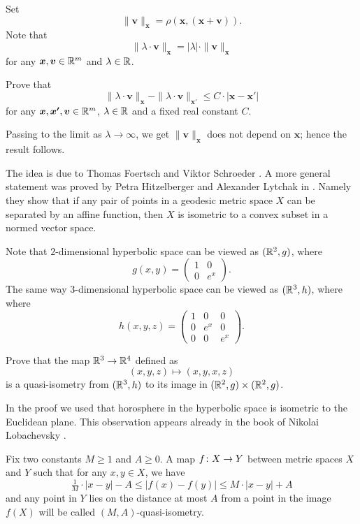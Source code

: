 Set 
\[\|\bm{v}\|_{\bm{x}}=\rho(\bm{x},(\bm{x}+\bm{v})).\]
Note that 
\[ \|\lambda\cdot\bm{v}\|_{\bm{x}}
=
|\lambda|\cdot\|\bm{v}\|_{\bm{x}}\]
for any $\bm{x},\bm{v}\in\mathbb{R}^m$ and $\lambda\in\mathbb{R}$.

Prove that 
\[
\|\lambda\cdot\bm{v}\|_{\bm{x}}
-
\|\lambda\cdot\bm{v}\|_{\bm{x}'}
\le 
C\cdot |\bm{x}-\bm{x'}|\]
for any $\bm{x},\bm{x'},\bm{v}\in\mathbb{R}^m$, 
$\lambda\in\mathbb{R}$
and a fixed real constant $C$.

Passing to the limit as $\lambda\to\infty$, 
we get
$\|\bm{v}\|_{\bm{x}}$ does not depend on $\bm{x}$;
hence the result follows.\qeds


The idea is due to Thomas Foertsch
and Viktor Schroeder \cite[see][]{foertsch-schroeder}.
A more general statement was proved by Petra Hitzelberger and Alexander Lytchak in \cite{hitzelberger-lytchak}.
Namely they show that 
if any pair of points in a geodesic metric space $X$ can be separated by an affine function,
then $X$ is isometric to a convex subset in a normed vector space.


Note that $2$-dimensional hyperbolic space 
can be viewed as $(\mathbb{R}^2,g)$, where 
\[g(x,y)=\left(\begin{matrix}
     1&0
     \\
     0&e^{x}
    \end{matrix}\right).\]
The same way $3$-dimensional hyperbolic space 
can be viewed as $(\mathbb{R}^3,h)$, where 
where 
\[h(x,y,z)=\left(\begin{matrix}
     1&0&0
     \\
     0&e^{x}&0
     \\
     0&0&e^{x}
    \end{matrix}\right).\]

Prove that the map $\mathbb{R}^3\to \mathbb{R}^4$ defined as
$$(x,y,z)\mapsto (x,y,x,z)$$
is a quasi-isometry from $(\mathbb{R}^3,h)$ to its image in $(\mathbb{R}^2,g)\times (\mathbb{R}^2,g)$.\qeds


In the proof we used that horosphere in the hyperbolic space is isometric to the Euclidean plane.
This observation appears already in the book of Nikolai Lobachevsky \cite[see 34 in][]{lobachevsky}.

Fix two constants $M\ge 1$ and $A\ge 0$.
A map $f\:X\z\to Y$ between metric spaces $X$ and $Y$ such that for any $x,y\in X$,
 we have
\[\tfrac1M\cdot |x-y|-A\le |f(x)-f(y)|\le M\cdot |x-y|+A\]
and any point in $Y$ lies on the distance at most $A$ from a point in the image $f(X)$
will be called $(M,A)$-quasi-isometry.

